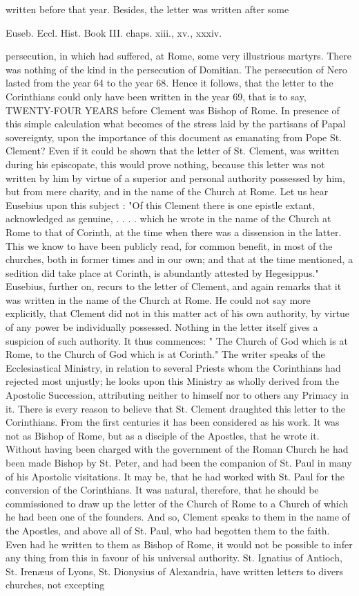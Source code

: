 written before that year. Besides, the letter was written after some

Euseb. Eccl. Hist. Book III. chaps. xiii., xv., xxxiv.

persecution, in which had suffered, at Rome, some very illustrious martyrs. There was nothing of the kind in the persecution of Domitian. The persecution of Nero lasted from the year 64 to the year 68. Hence it follows, that the letter to the Corinthians could only have been written in the year 69, that is to say, TWENTY-FOUR YEARS before Clement was Bishop of Rome. In presence of this simple calculation what becomes of the stress laid by the partisans of Papal sovereignty, upon the importance of this document as emanating from Pope St. Clement? Even if it could be shown that the letter of St. Clement, was written during his episcopate, this would prove nothing, because this letter was not written by him by virtue of a superior and personal authority possessed by him, but from mere charity, and in the name of the Church at Rome. Let us hear Eusebius upon this subject : "Of this Clement there is one epistle extant, acknowledged as genuine, . . . . which he wrote in the name of the Church at Rome to that of Corinth, at the time when there was a dissension in the latter. This we know to have been publicly read, for common benefit, in most of the churches, both in former times and in our own; and that at the time mentioned, a sedition did take place at Corinth, is abundantly attested by Hegesippus." Eusebius, further on, recurs to the letter of Clement, and again remarks that it was written in the name of the Church at Rome. He could not say more explicitly, that Clement did not in this matter act of his own authority, by virtue of any power be individually possessed. Nothing in the letter itself gives a suspicion of such authority. It thus commences: " The Church of God which is at Rome, to the Church of God which is at Corinth." The writer speaks of the Ecclesiastical Ministry, in relation to several Priests whom the Corinthians had rejected most unjustly; he looks upon this Ministry as wholly derived from the Apostolic Succession, attributing neither to himself nor to others any Primacy in it. There is every reason to believe that St. Clement draughted this letter to the Corinthians. From the first centuries it has been considered as his work. It was not as Bishop of Rome, but as a disciple of the Apostles, that he wrote it. Without having been charged with the government of the Roman Church he had been made Bishop by St. Peter, and had been the companion of St. Paul in many of his Apostolic visitations. It may be, that he had worked with St. Paul for the conversion of the Corinthians. It was natural, therefore, that he should be commissioned to draw up the letter of the Church of Rome to a Church of which he had been one of the founders. And so, Clement speaks to them in the name of the Apostles, and above all of St. Paul, who bad begotten them to the faith. Even had he written to them as Bishop of Rome, it would not be possible to infer any thing from this in favour of his universal authority. St. Ignatius of Antioch, St. Irenæus of Lyons, St. Dionysius of Alexandria, have written letters to divers churches, not excepting 